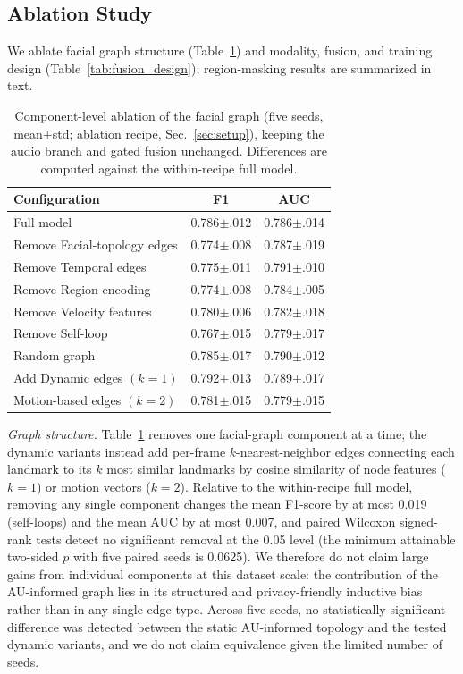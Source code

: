 \documentclass[conference]{IEEEtran}
\begin{document}
\subsection{Ablation Study}

We ablate facial graph structure (Table~\ref{tab:face_ablation}) and modality, fusion, and training design (Table~\ref{tab:fusion_design}); region-masking results are summarized in text.

\begin{table}[!t]
\centering
\caption{Component-level ablation of the facial graph (five seeds, mean$\pm$std; ablation recipe, Sec.~\ref{sec:setup}), keeping the audio branch and gated fusion unchanged. Differences are computed against the within-recipe full model.}
\label{tab:face_ablation}
\scriptsize
\setlength{\tabcolsep}{6pt}
\begin{tabular}{lcc}
\hline
Configuration & F1 & AUC \\
\hline
Full model & 0.786{\scriptsize$\pm$.012} & 0.786{\scriptsize$\pm$.014} \\
\hline
Remove Facial-topology edges & 0.774{\scriptsize$\pm$.008} & 0.787{\scriptsize$\pm$.019} \\
Remove Temporal edges & 0.775{\scriptsize$\pm$.011} & 0.791{\scriptsize$\pm$.010} \\
Remove Region encoding & 0.774{\scriptsize$\pm$.008} & 0.784{\scriptsize$\pm$.005} \\
Remove Velocity features & 0.780{\scriptsize$\pm$.006} & 0.782{\scriptsize$\pm$.018} \\
Remove Self-loop & 0.767{\scriptsize$\pm$.015} & 0.779{\scriptsize$\pm$.017} \\
\hline
Random graph & 0.785{\scriptsize$\pm$.017} & 0.790{\scriptsize$\pm$.012} \\
Add Dynamic edges $(k=1)$ & 0.792{\scriptsize$\pm$.013} & 0.789{\scriptsize$\pm$.017} \\
Motion-based edges $(k=2)$ & 0.781{\scriptsize$\pm$.015} & 0.779{\scriptsize$\pm$.015} \\
\hline
\end{tabular}
\end{table}

\textit{Graph structure.}
Table~\ref{tab:face_ablation} removes one facial-graph component at a time; the dynamic variants instead add per-frame \(k\)-nearest-neighbor edges connecting each landmark to its \(k\) most similar landmarks by cosine similarity of node features (\(k{=}1\)) or motion vectors (\(k{=}2\)). Relative to the within-recipe full model, removing any single component changes the mean F1-score by at most 0.019 (self-loops) and the mean AUC by at most 0.007, and paired Wilcoxon signed-rank tests detect no significant removal at the 0.05 level (the minimum attainable two-sided $p$ with five paired seeds is 0.0625). We therefore do not claim large gains from individual components at this dataset scale: the contribution of the AU-informed graph lies in its structured and privacy-friendly inductive bias rather than in any single edge type. Across five seeds, no statistically significant difference was detected between the static AU-informed topology and the tested dynamic variants, and we do not claim equivalence given the limited number of seeds.
\end{document}

